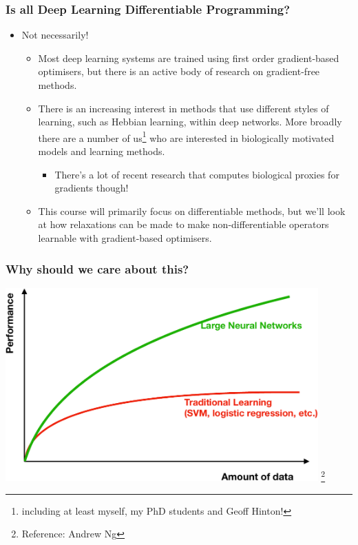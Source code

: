 \documentclass[]{article}
\newcommand\blfootnote[1]{%
  \begingroup
  \renewcommand\thefootnote{}\footnote{#1}%
  \addtocounter{footnote}{-1}%
  \endgroup
}
\begin{document}
\begin{frame}
\frametitle{Is all Deep Learning Differentiable Programming?}
\begin{itemize}
	\item Not necessarily!
	\begin{itemize}
		\item<+-> Most deep learning systems are trained using first order gradient-based optimisers, but there is an active body of research on gradient-free methods.
		\item<+-> There is an increasing interest in methods that use different styles of learning, such as Hebbian learning, within deep networks. More broadly there are a number of us\footnote{including at least myself, my PhD students and Geoff Hinton!} who are interested in biologically motivated models and learning methods.
		\begin{itemize}
			\item<+-> There's a lot of recent research that computes biological proxies for gradients though!
		\end{itemize}

		\item<+-> This course will primarily focus on differentiable methods, but we'll look at how relaxations can be made to make non-differentiable operators learnable with gradient-based optimisers.
	\end{itemize}
\end{itemize}
\end{frame}

\begin{frame}
	\frametitle{Why should we care about this?}
	\centering \includegraphics[width=0.9\textwidth]{Fig1.pdf}\blfootnote{Reference: Andrew Ng}
\end{frame}
\end{document}
